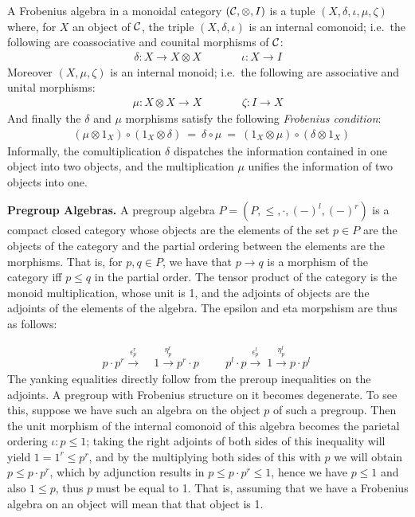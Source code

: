 A Frobenius algebra  in a   monoidal  category $({\cal
  C}, \otimes, I)$ is a tuple $(X,  \delta, \iota, \mu, \zeta)$ where,
for $X$ an object of ${\cal C}$, the triple $(X, \delta, \iota)$ is  an internal comonoid; 
i.e.~the following are  coassociative and counital  morphisms of ${\cal
  C}$:
\begin{align*}
\delta \colon X \to X \otimes X&\qquad& \iota \colon X \to I
\end{align*}
Moreover $(X, \mu, \zeta)$ is  an internal  monoid; i.e.~the following are  associative and unital  morphisms:
\begin{align*}
\mu \colon  X \otimes X \to X  &\qquad& \zeta \colon I \to X
\end{align*}
And finally the  $\delta$ and $\mu$ morphisms satisfy the
following \emph{Frobenius condition}:
\begin{align*}
\mbox{ $(\mu \otimes 1_X) \circ (1_X \otimes \delta) \ = \  \delta \circ \mu  \ = \  (1_X \otimes \mu) \circ (\delta \otimes 1_X)$}
\end{align*}
Informally, the  comultiplication $\delta$  dispatches the information contained in
one object into two objects, and the  multiplication $\mu$ unifies  the
information of two objects into one.

\medskip
\noindent
{\bf Pregroup Algebras.}
A pregroup algebra $P = (P, \leq, \cdot, (-)^l, (-)^r)$  is a compact closed category whose objects are the elements of the set $p \in P$ are the objects of the category and the partial ordering between the elements are the morphisms. That is,  for $p,q \in P$, we have that $p \to q$ is a morphism of the category iff $p \leq q$ in the partial order. The tensor product of the category is the monoid multiplication, whose unit is 1, and the adjoints of objects are the adjoints of the elements of the algebra.  The epsilon and eta morpshism are thus as follows:

\begin{align*}
p \cdot p^r \stackrel{\epsilon_p^r} {\longrightarrow} \; &1
\stackrel{\eta_p^r}{\longrightarrow} p^r \cdot p \hspace{1cm}
p^l \cdot p \stackrel{\epsilon_p^l}{\longrightarrow} \; 1
\stackrel{\eta_p^l}{\longrightarrow} p \cdot p^l\
\end{align*}
The yanking equalities directly follow from the preroup inequalities on the adjoints.  A pregroup with Frobenius structure on it becomes degenerate. To see this, suppose we have such an  algebra on the object $p$ of such a pregroup. Then the unit morphism of the internal comonoid of this algebra becomes the parietal ordering  $\iota \colon p \leq 1$; taking the right adjoints of both sides of this inequality will yield $1 = 1^r \leq p^r$, and by the multiplying both sides of this with $p$   we will obtain $p \leq p \cdot p^r$, which by adjunction results in $p \leq p \cdot p^r \leq 1$, hence we have $p \leq 1$ and also $1 \leq p$, thus $p$ must be equal to 1. That is, assuming that we have  a Frobenius algebra on an object will mean that that object is 1. 

